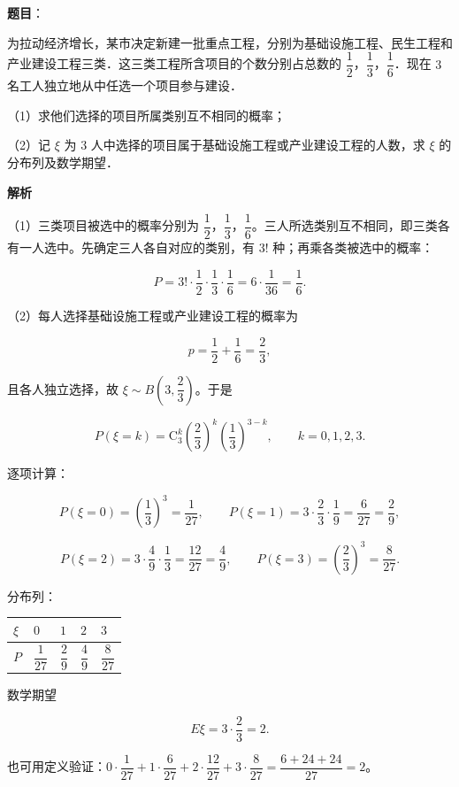 \begin{answer}

\textbf{题目}：

为拉动经济增长，某市决定新建一批重点工程，分别为基础设施工程、民生工程和产业建设工程三类．这三类工程所含项目的个数分别占总数的 $\dfrac12$，$\dfrac13$，$\dfrac16$．现在 $3$ 名工人独立地从中任选一个项目参与建设．

（1）求他们选择的项目所属类别互不相同的概率；

（2）记 $\xi$ 为 $3$ 人中选择的项目属于基础设施工程或产业建设工程的人数，求 $\xi$ 的分布列及数学期望．

\textbf{解析}

（1）三类项目被选中的概率分别为 $\dfrac12$，$\dfrac13$，$\dfrac16$。三人所选类别互不相同，即三类各有一人选中。先确定三人各自对应的类别，有 $3!$ 种；再乘各类被选中的概率：

\nopagebreak[4]
\[P=3!\cdot\frac12\cdot\frac13\cdot\frac16=6\cdot\frac1{36}=\frac16.\]

（2）每人选择基础设施工程或产业建设工程的概率为

\nopagebreak[4]
\[p=\frac12+\frac16=\frac23,\]

且各人独立选择，故 $\xi\sim B\left(3,\dfrac23\right)$。于是

\nopagebreak[4]
\[P(\xi=k)=\mathrm C_3^k\left(\frac23\right)^k\left(\frac13\right)^{3-k},\qquad k=0,1,2,3.\]

逐项计算：

\nopagebreak[4]
\[P(\xi=0)=\left(\frac13\right)^3=\frac1{27},\qquad
P(\xi=1)=3\cdot\frac23\cdot\frac19=\frac6{27}=\frac29,\]

\nopagebreak[4]
\[P(\xi=2)=3\cdot\frac49\cdot\frac13=\frac{12}{27}=\frac49,\qquad
P(\xi=3)=\left(\frac23\right)^3=\frac8{27}.\]

分布列：

\begin{center}
\begin{tabular}{lllll}
\toprule
$\xi$ & $0$ & $1$ & $2$ & $3$ \\
\midrule
$P$ & $\dfrac1{27}$ & $\dfrac29$ & $\dfrac49$ & $\dfrac8{27}$ \\
\bottomrule
\end{tabular}
\end{center}

数学期望

\nopagebreak[4]
\[E\xi=3\cdot\frac23=2.\]

也可用定义验证：$0\cdot\dfrac1{27}+1\cdot\dfrac6{27}+2\cdot\dfrac{12}{27}+3\cdot\dfrac8{27}=\dfrac{6+24+24}{27}=2$。


\end{answer}
